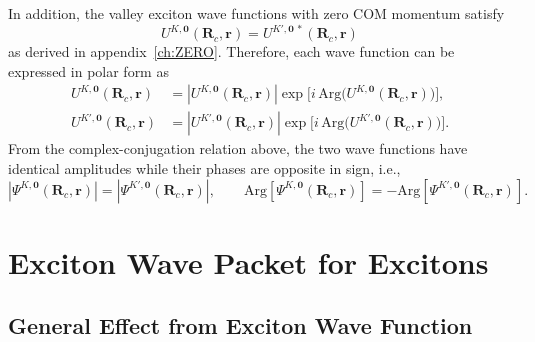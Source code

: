 In addition, the valley exciton wave functions with zero COM momentum satisfy
\begin{equation}
U^{K,\boldsymbol{0}} (\boldsymbol{R}_c,\boldsymbol{r})
=
U^{K',\boldsymbol{0}\,*} (\boldsymbol{R}_c,\boldsymbol{r})
\end{equation}
as derived in appendix~\ref{ch:ZERO}. Therefore, each wave function can be expressed in polar form as
\begin{equation}
\begin{aligned}
U^{K,\boldsymbol{0}} (\boldsymbol{R}_c,\boldsymbol{r})
&=
\left|U^{K,\boldsymbol{0}} (\boldsymbol{R}_c,\boldsymbol{r}) \right|
\exp\!\Big[i\,\mathrm{Arg}\big(U^{K,\boldsymbol{0}} (\boldsymbol{R}_c,\boldsymbol{r})\big)\Big],
\\
U^{K',\boldsymbol{0}} (\boldsymbol{R}_c,\boldsymbol{r})
&=
\left| U^{K',\boldsymbol{0}} (\boldsymbol{R}_c,\boldsymbol{r}) \right|
\exp\!\Big[i\,\mathrm{Arg}\big(U^{K',\boldsymbol{0}} (\boldsymbol{R}_c,\boldsymbol{r})\big)\Big].
\end{aligned}
\end{equation}
From the complex-conjugation relation above, the two wave functions have identical amplitudes while their phases are opposite in sign, i.e.,
\begin{equation}
\left|\Psi^{K,\boldsymbol{0}}(\boldsymbol{R}_c,\boldsymbol{r})\right|
=
\left|\Psi^{K',\boldsymbol{0}}(\boldsymbol{R}_c,\boldsymbol{r})\right|,
\qquad
\mathrm{Arg}\!\left[\Psi^{K,\boldsymbol{0}}(\boldsymbol{R}_c,\boldsymbol{r})\right]
=
-\mathrm{Arg}\!\left[\Psi^{K',\boldsymbol{0}}(\boldsymbol{R}_c,\boldsymbol{r})\right].
\label{conjugation_relation}
\end{equation}
%
%
%
%
%
%
\section{Exciton Wave Packet for Excitons}
\subsection{General Effect from Exciton Wave Function}

